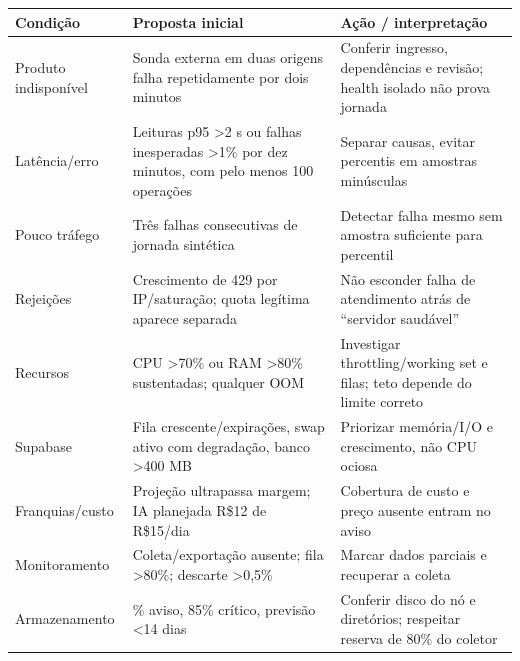 \documentclass[10pt,a4paper]{article}
\begin{document}
{\def\LTcaptype{none} %
\small
{}
\begin{longtable}[]{@{}
  >{\raggedright\arraybackslash}p{}
  >{\raggedright\arraybackslash}p{}
  >{\raggedright\arraybackslash}p{}@{}}
\toprule\noalign{}
\rowcolor{NFAccent}
\begin{minipage}[b]{\linewidth}\raggedright
Condição
\end{minipage} & \begin{minipage}[b]{\linewidth}\raggedright
Proposta inicial
\end{minipage} & \begin{minipage}[b]{\linewidth}\raggedright
Ação / interpretação
\end{minipage} \\
\midrule\noalign{}
\endhead
\bottomrule\noalign{}
\endlastfoot
Produto indisponível & Sonda externa em duas origens falha repetidamente
por dois minutos & Conferir ingresso, dependências e revisão; health
isolado não prova jornada \\
Latência/erro & Leituras p95 \textgreater2 s ou falhas inesperadas
\textgreater1\% por dez minutos, com pelo menos 100 operações & Separar
causas, evitar percentis em amostras minúsculas \\
Pouco tráfego & Três falhas consecutivas de jornada sintética & Detectar
falha mesmo sem amostra suficiente para percentil \\
Rejeições & Crescimento de 429 por IP/saturação; quota legítima aparece
separada & Não esconder falha de atendimento atrás de ``servidor
saudável'' \\
Recursos & CPU \textgreater70\% ou RAM \textgreater80\% sustentadas;
qualquer OOM & Investigar throttling/working set e filas; teto depende
do limite correto \\
Supabase & Fila crescente/expirações, swap ativo com degradação, banco
\textgreater400 MB & Priorizar memória/I/O e crescimento, não CPU
ociosa \\
Franquias/custo & Projeção ultrapassa margem; IA planejada R\$12 de
R\$15/dia & Cobertura de custo e preço ausente entram no aviso \\
Monitoramento & Coleta/exportação ausente; fila \textgreater80\%;
descarte \textgreater0,5\% & Marcar dados parciais e recuperar a
coleta \\
Armazenamento & 70\% aviso, 85\% crítico, previsão \textless14 dias &
Conferir disco do nó e diretórios; respeitar reserva de 80\% do
coletor \\
\end{longtable}
}
\end{document}
